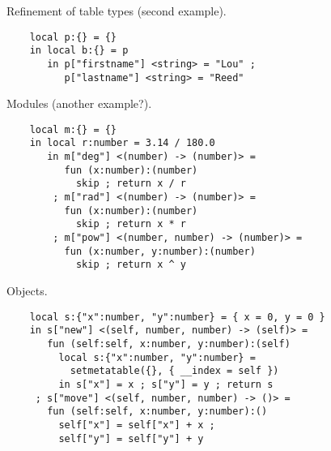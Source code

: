 Refinement of table types (second example).

\begin{verbatim}
    local p:{} = {}
    in local b:{} = p
       in p["firstname"] <string> = "Lou" ;
          p["lastname"] <string> = "Reed"
\end{verbatim}

Modules (another example?).

\begin{verbatim}
    local m:{} = {}
    in local r:number = 3.14 / 180.0
       in m["deg"] <(number) -> (number)> =
          fun (x:number):(number)
            skip ; return x / r
        ; m["rad"] <(number) -> (number)> =
          fun (x:number):(number)
            skip ; return x * r
        ; m["pow"] <(number, number) -> (number)> =
          fun (x:number, y:number):(number)
            skip ; return x ^ y
\end{verbatim}

Objects.

\begin{verbatim}
    local s:{"x":number, "y":number} = { x = 0, y = 0 }
    in s["new"] <(self, number, number) -> (self)> =
       fun (self:self, x:number, y:number):(self)
         local s:{"x":number, "y":number} =
           setmetatable({}, { __index = self })
         in s["x"] = x ; s["y"] = y ; return s
     ; s["move"] <(self, number, number) -> ()> =
       fun (self:self, x:number, y:number):()
         self["x"] = self["x"] + x ;
         self["y"] = self["y"] + y 
\end{verbatim}
